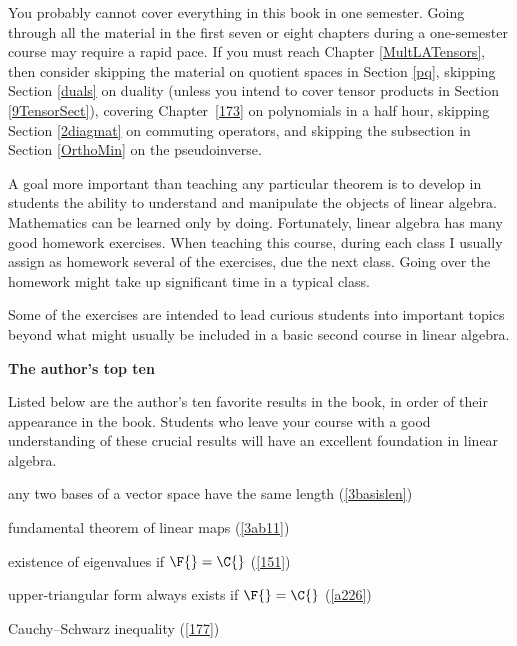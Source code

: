 {You probably cannot cover everything in this book in one semester.  Going through all the material in the first seven or eight chapters during a one-semester course may require a rapid pace.  If you must reach Chapter \ref{MultLATensors},
then consider skipping the material on quotient spaces in Section \ref{pq}, skipping Section \ref{duals} on duality (unless you intend to cover tensor products in Section \ref{9TensorSect}), covering Chapter~\ref{173} on polynomials in a half hour, skipping Section \ref{2diagmat} on commuting operators, and skipping the subsection in Section \ref{OrthoMin} on the pseudoinverse.

A goal more important than teaching any particular theorem is to develop
in students the ability to understand  and manipulate the objects of linear
algebra.   Mathematics can  be learned only by doing. Fortunately, linear
algebra has many good homework exercises.  When teaching this course, during each class I
usually  assign as homework several of the exercises, due the next
class. Going over the homework might take up significant time in a typical class.

Some of the exercises are intended to lead curious students into important topics beyond what might usually be included in a basic second course in linear algebra.

\bigskip

\textbf{The author's top ten}

\medskip

\noindent
Listed below are the author's ten favorite results in the book, in order of their appearance in the book. Students who leave your course with a good understanding of these crucial results will have an excellent foundation in linear algebra.

\begin{Itemize}
\item
any two bases of a vector space have the same length (\ref{3basislen})

\item
fundamental theorem of linear maps (\ref{3ab11})

\item
existence of eigenvalues if $\F{} = \C{}$ (\ref{151})

\item
upper-triangular form always exists if $\F{} = \C{}$ (\ref{a226})

\item
Cauchy--Schwarz inequality (\ref{177})


\end{Itemize}}

